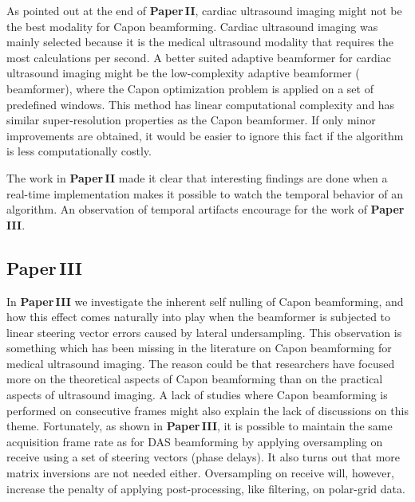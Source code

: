 As pointed out at the end of \textbf{Paper\,II}, cardiac ultrasound imaging might not be the best modality for Capon beamforming. Cardiac ultrasound imaging was mainly selected because it is the medical ultrasound modality that requires the most calculations per second. A better suited adaptive beamformer for cardiac ultrasound imaging might be the low-complexity adaptive beamformer ( beamformer), where the Capon optimization problem is applied on a set of predefined windows. This method has linear computational complexity and has similar super-resolution properties as the Capon beamformer. If only minor improvements are obtained, it would be easier to ignore this fact if the algorithm is less computationally costly. %

The work in \textbf{Paper\,II} made it clear that interesting findings are done when a real-time implementation makes it possible to watch the temporal behavior of an algorithm. An observation of temporal artifacts encourage for the work of \textbf{Paper\,III}. 

\subsection{Paper\,III}
In \textbf{Paper\,III} we investigate the inherent self nulling of Capon beamforming, and how this effect comes naturally into play when the beamformer is subjected to linear steering vector errors caused by lateral undersampling. This observation is something which has been missing in the literature on Capon beamforming for medical ultrasound imaging. The reason could be that researchers have focused more on the theoretical aspects of Capon beamforming than on the practical aspects of ultrasound imaging. A lack of studies where Capon beamforming is performed on consecutive frames might also explain the lack of discussions on this theme. Fortunately, as shown in \textbf{Paper\,III}, it is possible to maintain the same acquisition frame rate as for DAS beamforming by applying oversampling on receive using a set of steering vectors (phase delays). It also turns out that more matrix inversions are not needed either. Oversampling on receive will, however,  increase the penalty of applying post-processing, like filtering,  on polar-grid data. %

